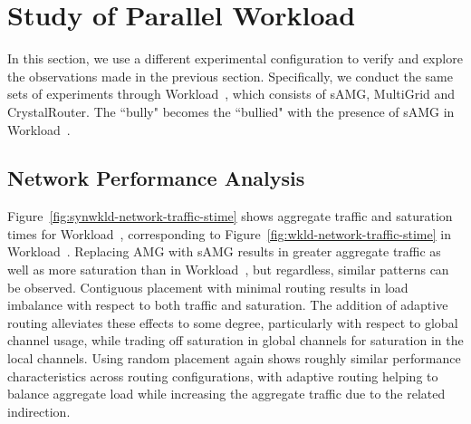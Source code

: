 
\section{Study of Parallel Workload }
\label{sec:workload-2}

In this section, we use a different experimental configuration to verify and
explore the observations made in the previous section. Specifically, we conduct
the same sets of experiments through Workload~, which consists of sAMG,
MultiGrid and CrystalRouter.
The ``bully" becomes the ``bullied" with the presence of sAMG in Workload~. 


\subsection{Network Performance Analysis}
\label{sec: workload-2 network analysis}

Figure~\ref{fig:synwkld-network-traffic-stime} shows aggregate traffic and
saturation times for Workload~, corresponding to
Figure~\ref{fig:wkld-network-traffic-stime} in Workload~. Replacing
AMG with sAMG results in greater aggregate traffic as well as more saturation
than in Workload~, but regardless, similar patterns can be observed.
Contiguous placement with minimal routing results in load imbalance with
respect to both traffic and saturation. The addition of adaptive routing
alleviates these effects to some degree, particularly with respect to global
channel usage, while trading off saturation in global channels for saturation in
the local channels. Using random placement again shows roughly similar performance
characteristics across routing configurations, with adaptive routing helping to
balance aggregate load while increasing the aggregate traffic due to the related
indirection.

